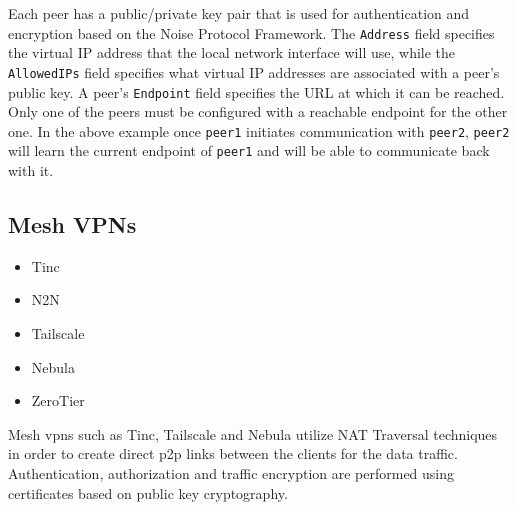 Each peer has a public/private key pair that is used for authentication
and encryption based on the Noise Protocol
Framework\autocite{noiseDocs}. The \texttt{Address} field specifies the
virtual IP address that the local network interface will use, while the
\texttt{AllowedIPs} field specifies what virtual IP addresses are
associated with a peer's public key. A peer's \texttt{Endpoint} field
specifies the URL at which it can be reached. Only one of the peers must
be configured with a reachable endpoint for the other one. In the above
example once \texttt{peer1} initiates communication with \texttt{peer2},
\texttt{peer2} will learn the current endpoint of \texttt{peer1} and
will be able to communicate back with it.

\hypertarget{mesh-vpns}{%
\subsection{Mesh VPNs}\label{mesh-vpns}}

\begin{itemize}
\tightlist
\item
  Tinc
\item
  N2N
\item
  Tailscale
\item
  Nebula
\item
  ZeroTier
\end{itemize}

Mesh \glspl{vpn} such as Tinc\autocite{tincDocs},
Tailscale\autocite{tailscaleDocs} and Nebula\autocite{nebulaDocs}
utilize NAT Traversal techniques in order to create direct \gls{p2p}
links between the clients for the data traffic. Authentication,
authorization and traffic encryption are performed using certificates
based on public key cryptography.

